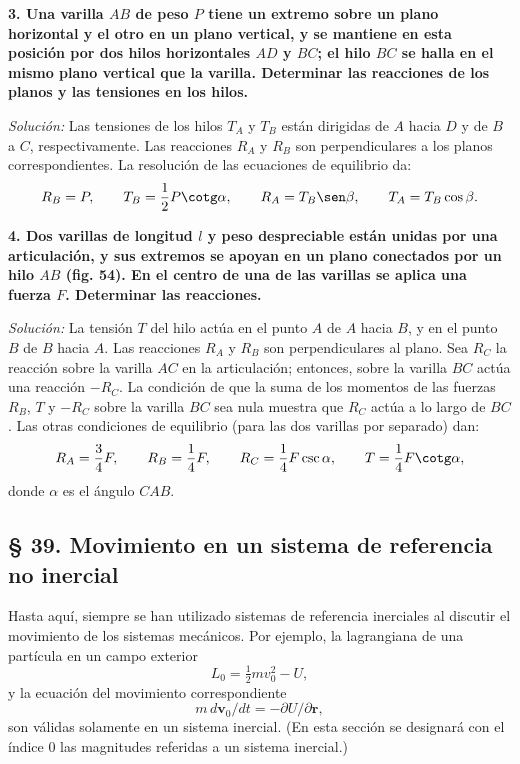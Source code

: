 \documentclass[12pt]{article}
\begin{document}
\vspace{1cm}

\textbf{3. Una varilla $AB$ de peso $P$ tiene un extremo sobre un plano horizontal y el otro en un plano vertical, y se mantiene en esta posición por dos hilos horizontales $AD$ y $BC$; el hilo $BC$ se halla en el mismo plano vertical que la varilla. Determinar las reacciones de los planos y las tensiones en los hilos.}

\textit{Solución:} Las tensiones de los hilos $T_A$ y $T_B$ están dirigidas de $A$ hacia $D$ y de $B$ a $C$, respectivamente. Las reacciones $R_A$ y $R_B$ son perpendiculares a los planos correspondientes. La resolución de las ecuaciones de equilibrio da:
\[
R_B = P, \qquad T_B = \frac{1}{2}P \cotg \alpha, \qquad R_A = T_B \sen \beta, \qquad T_A = T_B \cos \beta.
\]

\vspace{1cm}

\textbf{4. Dos varillas de longitud $l$ y peso despreciable están unidas por una articulación, y sus extremos se apoyan en un plano conectados por un hilo $AB$ (fig. 54). En el centro de una de las varillas se aplica una fuerza $F$. Determinar las reacciones.}

\textit{Solución:} La tensión $T$ del hilo actúa en el punto $A$ de $A$ hacia $B$, y en el punto $B$ de $B$ hacia $A$. Las reacciones $R_A$ y $R_B$ son perpendiculares al plano. Sea $R_C$ la reacción sobre la varilla $AC$ en la articulación; entonces, sobre la varilla $BC$ actúa una reacción $-R_C$. La condición de que la suma de los momentos de las fuerzas $R_B$, $T$ y $-R_C$ sobre la varilla $BC$ sea nula muestra que $R_C$ actúa a lo largo de $BC$. Las otras condiciones de equilibrio (para las dos varillas por separado) dan:
\[
R_A = \frac{3}{4}F, \qquad R_B = \frac{1}{4}F, \qquad R_C = \frac{1}{4}F \csc \alpha, \qquad T = \frac{1}{4}F \cotg \alpha,
\]
donde $\alpha$ es el ángulo $CAB$.

\vspace{1cm}

\subsection*{§ 39. Movimiento en un sistema de referencia no inercial}

Hasta aquí, siempre se han utilizado sistemas de referencia inerciales al discutir el movimiento de los sistemas mecánicos. Por ejemplo, la lagrangiana de una partícula en un campo exterior
\begin{equation}
L_0 = \tfrac{1}{2} m v_0^2 - U,
\tag{39.1}
\end{equation}
y la ecuación del movimiento correspondiente
\begin{equation}
m \, d\mathbf{v}_0/dt = -\partial U/\partial \mathbf{r},
\end{equation}
son válidas solamente en un sistema inercial. (En esta sección se designará con el índice 0 las magnitudes referidas a un sistema inercial.)
\end{document}
